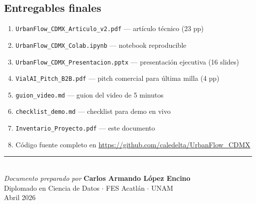 \documentclass[11pt,a4paper]{article}
\begin{document}
\subsection{Entregables finales}
\begin{enumerate}
  \item \texttt{UrbanFlow\_CDMX\_Articulo\_v2.pdf} --- artículo técnico (23 pp)
  \item \texttt{UrbanFlow\_CDMX\_Colab.ipynb} --- notebook reproducible
  \item \texttt{UrbanFlow\_CDMX\_Presentacion.pptx} --- presentación ejecutiva (16 slides)
  \item \texttt{VialAI\_Pitch\_B2B.pdf} --- pitch comercial para última milla (4 pp)
  \item \texttt{guion\_video.md} --- guion del video de 5 minutos
  \item \texttt{checklist\_demo.md} --- checklist para demo en vivo
  \item \texttt{Inventario\_Proyecto.pdf} --- este documento
  \item Código fuente completo en \url{https://github.com/caledelta/UrbanFlow_CDMX}
\end{enumerate}

\vfill
\begin{center}
{\color{navy}\rule{0.6\textwidth}{0.5pt}}\\[0.5em]
\textit{Documento preparado por} \textbf{Carlos Armando López Encino}\\
Diplomado en Ciencia de Datos \(\cdot\) FES Acatlán \(\cdot\) UNAM\\
Abril 2026
\end{center}
\end{document}
